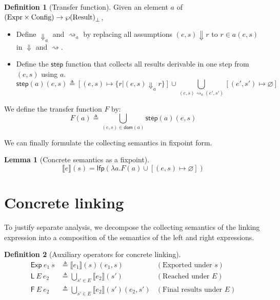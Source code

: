 \documentclass[acmsmall,screen,review]{acmart}
\theoremstyle{definition}
\newtheorem{definition}{Definition}[section]
\newtheorem{lem}{Lemma}[section]
\newcommand*{\Expr}{\text{Expr}}
\newcommand*{\Time}{\mathbb{T}}
\newcommand*{\Config}[1]{\text{Config}\vphantom{#1}}
\newcommand*{\Result}[1]{\text{Result}\vphantom{#1}}
\newcommand*{\EE}{\mathsf{Exp}}
\newcommand*{\LL}{\mathsf{L}}
\newcommand*{\sembracket}[1]{\lBrack{#1}\rBrack}
\begin{document}
\begin{definition}[Transfer function]
  Given an element $a$ of $(\Expr\times\Config{\Time})\rightarrow{\wp(\Result{\Time})}_{\bot}$,

  \begin{itemize}
    \item Define ${\Downarrow}_{a}$ and ${\rightsquigarrow}_{a}$ by replacing all assumptions $(e,s)\Downarrow r$ to $r\in a(e,s)$ in $\Downarrow$ and $\rightsquigarrow$.
    \item Define the ${\mathsf{step}}$ function that collects all results derivable in one step from $(e,s)$ using $a$.
          \[
            \mathsf{step}(a)(e,s)\triangleq
            [(e,s)\mapsto\{r|(e,s){\Downarrow}_{a}r\}]
            \cup
            \bigcup_{(e,s)\rightsquigarrow_{a}(e',s')}[(e',s')\mapsto\varnothing]
          \]
  \end{itemize}

  We define the transfer function $F$ by:
  \[
    F(a)\triangleq
    \bigcup_{(e,s)\in\mathsf{dom}(a)}
    {\mathsf{step}(a)(e,s)}
  \]
\end{definition}

We can finally formulate the collecting semantics in fixpoint form.
\begin{lem}[Concrete semantics as a fixpoint]
  \[
    \sembracket{e}(s)=\mathsf{lfp}(\lambda a.F(a)\cup[(e,s)\mapsto\varnothing])
  \]
\end{lem}

\section{Concrete linking}
To justify separate analysis, we decompose the collecting semantics of the linking expression into a composition of the semantics of the left and right expressions.

\begin{definition}[Auxiliary operators for concrete linking]
  \begin{align*}
    \EE\:e_1\:s        & \triangleq\sembracket{e_1}(s)(e_1,s)                    & (\text{Exported under }s)      \\
    \LL\:E\:e_2        & \triangleq\bigcup_{s'\in E}\sembracket{e_2}(s')         & (\text{Reached under }E)       \\
    \mathsf{F}\:E\:e_2 & \triangleq\bigcup_{s'\in E}\sembracket{e_2}(s')(e_2,s') & (\text{Final results under }E)
  \end{align*}
\end{definition}
\end{document}
